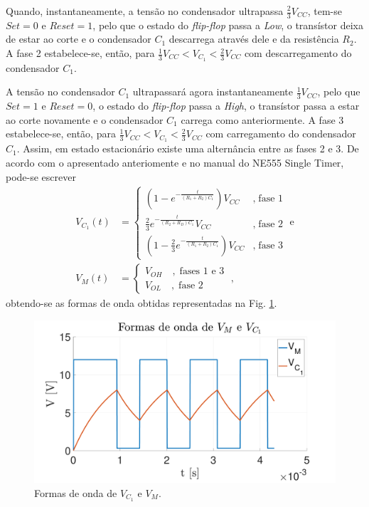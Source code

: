 Quando, instantaneamente, a tensão no condensador ultrapassa $\frac{2}{3} V_{CC}$, tem-se $\textit{Set} = 0$ e $\textit{Reset} = 1$, pelo que o estado do \textit{flip-flop} passa a \textit{Low}, o transístor deixa de estar ao corte e o condensador $C_1$ descarrega através dele e da resistência $R_2$. A fase 2 estabelece-se, então, para $\frac{1}{3} V_{CC} < V_{C_1} < \frac{2}{3} V_{CC}$ com descarregamento do condensador $C_1$.

A tensão no condensador $C_1$ ultrapassará agora instantaneamente $\frac{1}{3} V_{CC}$, pelo que $\textit{Set} = 1$ e $\textit{Reset} = 0$, o estado do \textit{flip-flop} passa a \textit{High}, o transístor passa a estar ao corte novamente e o condensador $C_1$ carrega como anteriormente. A fase 3 estabelece-se, então, para $\frac{1}{3} V_{CC} < V_{C_1} < \frac{2}{3} V_{CC}$ com carregamento do condensador $C_1$. Assim, em estado estacionário existe uma alternância entre as fases 2 e 3. De acordo com o apresentado anteriomente e no manual do NE555 Single Timer, pode-se escrever
\begin{align}
    V_{C_1} (t) &= \left\{
\begin{array}{ll}
\left (1- e^{-\frac{t}{(R_1+R_2) C_1}} \right) V_{CC} &, \; \text{fase 1} \\
\frac{2}{3} e^{-\frac{t}{\left (R_2 + R_D \right) C_1}} V_{CC} &, \; \text{fase 2} \\
\left (1-\frac{2}{3} e^{-\frac{t}{(R_1+R_2) C_1}} \right) V_{CC} &, \; \text{fase 3}
\end{array}\; \text{e}
\right. \label{VC1}\\
V_M (t) &= \left\{
\begin{array}{ll}
V_{OH} \quad, \; \text{fases 1 e 3} \\
V_{OL} \quad, \; \text{fase 2}
\end{array}\;,
\right. \label{VM}
\end{align}
obtendo-se as formas de onda obtidas representadas na Fig. \ref{fig:VM_VC1_tempo}.

\begin{figure}[ht]
    \centering
    \includegraphics[width=\linewidth]{Imagens/VM_VC1_tempo.pdf}
    \caption{Formas de onda de $V_{C_1}$ e $V_M$.}
    \label{fig:VM_VC1_tempo}
\end{figure}

